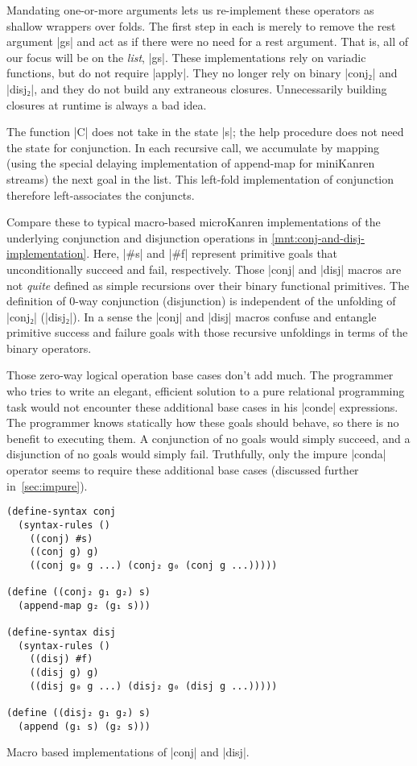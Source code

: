 \documentclass[sigplan,screen,draft,anonymous,review,natbib=false]{acmart}
\begin{document}
Mandating one-or-more arguments lets us re-implement these operators
as shallow wrappers over folds. The first step in each is merely to
remove the rest argument \rackinline|gs| and act as if there were no
need for a rest argument. That is, all of our focus will be on the
\emph{list}, \rackinline|gs|. These implementations rely on variadic
functions, but do not require \rackinline|apply|. They no longer rely
on binary \rackinline|conj₂| and \rackinline|disj₂|, and they do not
build any extraneous closures. Unnecessarily building closures at
runtime is always a bad idea.

The function \rackinline|C| does not take in the state \rackinline|s|;
the help procedure does not need the state for conjunction. In each
recursive call, we accumulate by mapping (using the special delaying
implementation of append-map for miniKanren streams) the next goal in
the list. This left-fold implementation of conjunction therefore
left-associates the conjuncts.

Compare these to typical macro-based microKanren implementations of
the underlying conjunction and disjunction operations in
\cref{mnt:conj-and-disj-implementation}. Here, \rackinline|#s| and
\rackinline|#f| represent primitive goals that unconditionally succeed
and fail, respectively. Those \rackinline|conj| and \rackinline|disj|
macros are not \emph{quite} defined as simple recursions over their
binary functional primitives. The definition of 0-way conjunction
(disjunction) is independent of the unfolding of \rackinline|conj₂|
(\rackinline|disj₂|). In a sense the \rackinline|conj| and
\rackinline|disj| macros confuse and entangle primitive success and
failure goals with those recursive unfoldings in terms of the binary
operators.

Those zero-way logical operation base cases don't add much. The
programmer who tries to write an elegant, efficient solution to a pure
relational programming task would not encounter these additional base
cases in his \rackinline|conde| expressions. The programmer knows
statically how these goals should behave, so there is no benefit to
executing them. A conjunction of no goals would simply succeed, and a
disjunction of no goals would simply fail. Truthfully, only the impure
\rackinline|conda| operator seems to require these additional base
cases (discussed further in~\cref{sec:impure}).

\begin{listing}
  \begin{verbatim}
(define-syntax conj
  (syntax-rules ()
    ((conj) #s)
    ((conj g) g)
    ((conj g₀ g ...) (conj₂ g₀ (conj g ...)))))

(define ((conj₂ g₁ g₂) s)
  (append-map g₂ (g₁ s)))

(define-syntax disj
  (syntax-rules ()
    ((disj) #f)
    ((disj g) g)
    ((disj g₀ g ...) (disj₂ g₀ (disj g ...)))))

(define ((disj₂ g₁ g₂) s)
  (append (g₁ s) (g₂ s)))
  \end{verbatim}
  \caption{Macro based implementations of \rackinline|conj| and \rackinline|disj|.}
  \label{mnt:conj-and-disj-implementation}
\end{listing}
\end{document}
